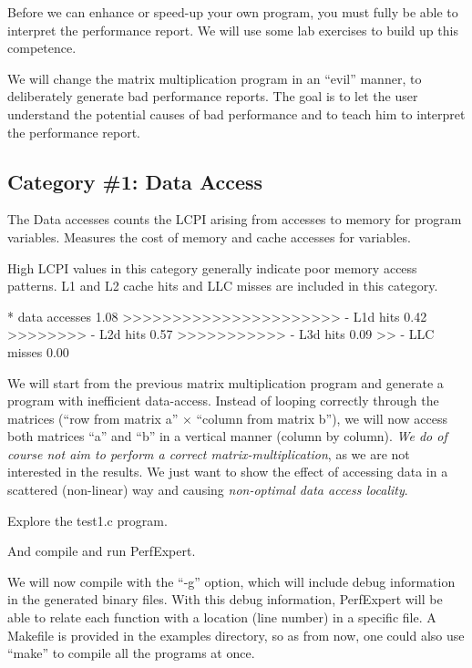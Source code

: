 Before we can enhance or speed-up your own program, you must fully be able to interpret the performance report. We will use some lab exercises to build up this competence.

We will change the matrix multiplication program in an ``evil'' manner, to deliberately generate bad performance reports. The goal is to let the user understand the potential causes of bad performance and to teach him to interpret the performance report.

\subsection{Category \#1: Data Access}
\label{ch02:subsec:CAT1_Data_Access}

The Data accesses counts the LCPI arising from accesses to memory for program variables. Measures the cost of memory and cache accesses for variables.

High LCPI values in this category generally indicate poor memory access patterns. L1 and L2 cache hits and LLC misses are included in this category.

\begin{prompt}
* data accesses          1.08 >>>>>>>>>>>>>>>>>>>>>>
  - L1d hits             0.42 >>>>>>>>
  - L2d hits             0.57 >>>>>>>>>>>
  - L3d hits             0.09 >>
  - LLC misses           0.00
\end{prompt}

We will start from the previous matrix multiplication program and generate a program with inefficient data-access. Instead of looping correctly through the matrices (``row from matrix a'' $\times$ ``column from matrix b''), we will now access both matrices ``a'' and ``b'' in a vertical manner (column by column). \emph{We do of course not aim to perform a correct matrix-multiplication}, as we are not interested in the results. We just want to show the effect of accessing data in a scattered (non-linear) way and causing \emph{non-optimal data access locality}.

Explore the test1.c program.

\begin{prompt}
\end{prompt}

And compile and run PerfExpert.

We will now compile with the ``-g'' option, which will include debug information in the generated binary files. With this debug information, PerfExpert will be able to relate each function with a location (line number) in a specific file. A Makefile is provided in the examples directory, so as from now, one could also use ``make'' to compile all the programs at once.

